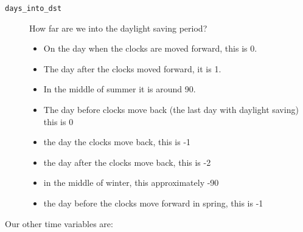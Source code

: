 \begin{description}
    \item[\texttt{days\_into\_dst}] How far are we into the daylight saving period?
    \begin{itemize}
       \item  On the day when the clocks are moved forward, this is 0. 
       \item  The day after the clocks moved forward, it is 1.
       \item  In the middle of summer it is around 90.
       \item  The day before clocks move back (the last day with daylight saving) this is 0
       \item  the day the clocks move back, this is -1
       \item  the day after the clocks move back, this is -2
       \item  in the middle of winter, this approximately -90
       \item  the day before the clocks move forward in spring, this is -1
    \end{itemize}
\end{description}

Our other time variables are:

